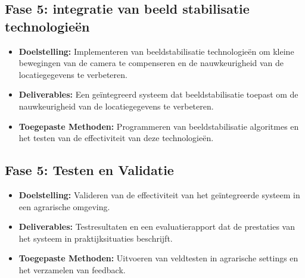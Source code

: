 \subsection{Fase 5: integratie van beeld stabilisatie technologieën}
\begin{itemize}
    \item \textbf{Doelstelling:} Implementeren van beeldstabilisatie technologieën om kleine bewegingen van de camera te compenseren en de nauwkeurigheid van de locatiegegevens te verbeteren.
    \item \textbf{Deliverables:} Een geïntegreerd systeem dat beeldstabilisatie toepast om de nauwkeurigheid van de locatiegegevens te verbeteren.
    \item \textbf{Toegepaste Methoden:} Programmeren van beeldstabilisatie algoritmes en het testen van de effectiviteit van deze technologieën.
\end{itemize}
\subsection{Fase 5: Testen en Validatie}
\begin{itemize}
    \item \textbf{Doelstelling:} Valideren van de effectiviteit van het geïntegreerde systeem in een agrarische omgeving.
    \item \textbf{Deliverables:}  Testresultaten en een evaluatierapport dat de prestaties van het systeem in praktijksituaties beschrijft.
    \item \textbf{Toegepaste Methoden:} Uitvoeren van veldtesten in agrarische settings en het verzamelen van feedback.
\end{itemize}